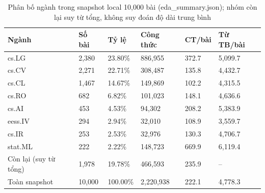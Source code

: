 \begin{table}[htbp]
\centering
\small
\caption{Phân bố ngành trong snapshot local 10,000 bài (eda\_summary.json); nhóm còn lại suy từ tổng, không suy đoán độ dài trung bình}
\label{tab:eda_categories}
\begin{tabularx}{\textwidth}{|p{2.3cm}|L|L|L|L|L|}
\hline
\textbf{Ngành} & \textbf{Số bài} & \textbf{Tỷ lệ} & \textbf{Công thức} & \textbf{CT/bài} & \textbf{Từ TB/bài} \\
\hline
cs.LG & 2,380 & 23.80\% & 886,955 & 372.7 & 5,099.7 \\
\hline
cs.CV & 2,271 & 22.71\% & 308,487 & 135.8 & 4,432.7 \\
\hline
cs.CL & 1,467 & 14.67\% & 149,869 & 102.2 & 4,315.5 \\
\hline
cs.RO & 682 & 6.82\% & 101,023 & 148.1 & 4,636.6 \\
\hline
cs.AI & 453 & 4.53\% & 94,302 & 208.2 & 5,383.9 \\
\hline
eess.IV & 294 & 2.94\% & 32,010 & 108.9 & 3,559.7 \\
\hline
cs.IR & 253 & 2.53\% & 32,976 & 130.3 & 4,706.7 \\
\hline
stat.ML & 222 & 2.22\% & 148,723 & 669.9 & 6,119.4 \\
\hline
Còn lại (suy từ tổng) & 1,978 & 19.78\% & 466,593 & 235.9 & -- \\
\hline
Toàn snapshot & 10,000 & 100.00\% & 2,220,938 & 222.1 & 4,778.3 \\
\hline
\end{tabularx}
\end{table}
